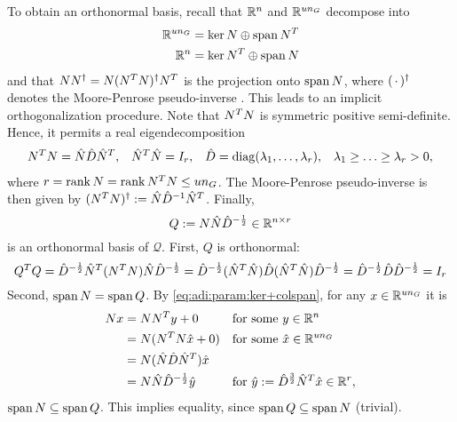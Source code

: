 To obtain an orthonormal basis,
recall that $\mathbb{R}^n$ and $\mathbb{R}^{un_G}$ decompose into
\begin{equation}
\label{eq:adi:param:ker+colspan}
\begin{aligned}
  \mathbb{R}^{un_G} = \ker N \oplus \operatorname{span} N^T \\
  \mathbb{R}^n = \ker N^T \oplus \operatorname{span} N
\end{aligned}
\end{equation}
and that $NN^\dagger = N (N^T N)^\dagger N^T$ is the projection onto $\operatorname{span} N$,
where $(\optional{})^\MP$ denotes the Moore-Penrose pseudo-inverse \cite{Strang2016}.
This leads to an implicit orthogonalization procedure.
Note that $N^T N$ is symmetric positive semi-definite.
Hence, it permits a real eigendecomposition
\begin{align*}
  N^T N &= \hat N \hat D \hat N^T, &
  \hat N^T \hat N &= I_r, &
  \hat D &= \operatorname{diag}(\lambda_1, \ldots, \lambda_r), &
  \lambda_1 \geq \ldots \geq \lambda_r > 0,
\end{align*}
where $r = \operatorname{rank} N = \operatorname{rank} N^T N \leq u n_G$.
The Moore-Penrose pseudo-inverse is then given by \mbox{$(N^T N)^\dagger := \hat N \hat D^{-1} \hat N^T$}.
Finally,
\begin{equation}
\label{eq:adi:param:Q}
  Q := N \hat N \hat D^{-\frac{1}{2}}
  \in\mathbb{R}^{n\times r}
\end{equation}
is an orthonormal basis of $\mathcal Q$.
First, $Q$ is orthonormal:
\begin{equation*}
  Q^T Q
  = \hat D^{-\frac{1}{2}} \hat N^T (N^T N) \hat N \hat D^{-\frac{1}{2}}
  = \hat D^{-\frac{1}{2}} (\hat N^T \hat N) \hat D (\hat N^T \hat N) \hat D^{-\frac{1}{2}}
  = \hat D^{-\frac{1}{2}} \hat D \hat D^{-\frac{1}{2}}
  = I_r
\end{equation*}
Second, $\operatorname{span} N = \operatorname{span} Q$.
By \eqref{eq:adi:param:ker+colspan},
for any $x\in\mathbb{R}^{un_G}$ it is
\begin{align*}
  Nx
  &= NN^T y + 0 &&\text{for some $y\in\mathbb{R}^n$} \\
  &= N(N^T N \hat x + 0) && \text{for some $\hat x \in\mathbb{R}^{un_G}$} \\
  &= N (\hat N \hat D \hat N^T) \hat x \\
  &= N \hat N \hat D^{-\frac{1}{2}} \hat y && \text{for $\hat y := \hat D^{\frac{3}{2}} \hat N^T \hat x \in \mathbb{R}^r$}
  ,
\end{align*}
\ie $\operatorname{span} N \subseteq \operatorname{span} Q$.
This implies equality,
since $\operatorname{span} Q \subseteq \operatorname{span} N$ (trivial).

\pagebreak

